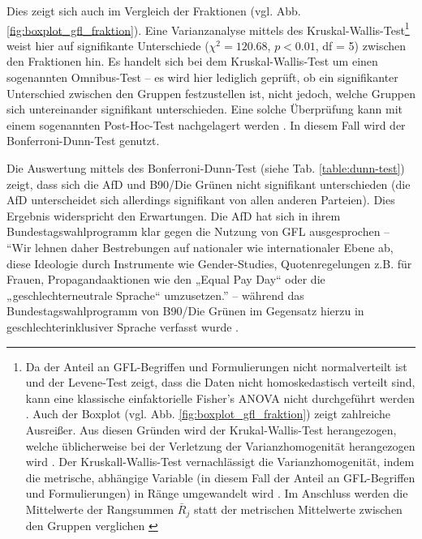 \documentclass[12pt, 
    twoside=false, 
    bibliography=totoc, 
    numbers=endperiod, 
    headings=normal, 
    toc=chapterentrydotfill
    ]{scrbook}
\begin{document}
Dies zeigt sich auch im Vergleich der Fraktionen (vgl. Abb. \ref{fig:boxplot_gfl_fraktion}). Eine Varianzanalyse mittels des Kruskal-Wallis-Test\footnote{Da der Anteil an GFL-Begriffen und Formulierungen nicht normalverteilt ist und der Levene-Test zeigt, dass die Daten nicht homoskedastisch verteilt sind, kann eine klassische einfaktorielle Fisher's ANOVA nicht durchgeführt werden \parencite[64]{huber_2014}. Auch der Boxplot (vgl. Abb. \ref{fig:boxplot_gfl_fraktion}) zeigt zahlreiche Ausreißer. Aus diesen Gründen wird der Krukal-Wallis-Test herangezogen, welche üblicherweise bei der Verletzung der Varianzhomogenität herangezogen wird \parencite[339]{kuhlenkasper_2017}. Der Kruskall-Wallis-Test vernachlässigt die Varianzhomogenität, indem die metrische, abhängige Variable (in diesem Fall der Anteil an GFL-Begriffen und Formulierungen) in Ränge umgewandelt wird \parencite[339f]{kuhlenkasper_2017}. Im Anschluss werden die Mittelwerte der Rangsummen $\bar{R}_j$ statt der metrischen Mittelwerte zwischen den Gruppen verglichen \parencite[340ff.]{kuhlenkasper_2017}} weist hier auf signifikante Unterschiede (${\chi}^2 = 120.68$, $p < 0.01$, df = 5) zwischen den Fraktionen hin.
Es handelt sich bei dem Kruskal-Wallis-Test um einen sogenannten Omnibus-Test \parencite[184]{backhaus_2016} -- es wird hier lediglich geprüft, ob ein signifikanter Unterschied zwischen den Gruppen festzustellen ist, nicht jedoch, welche Gruppen sich untereinander signifikant unterschieden. Eine solche Überprüfung kann mit einem sogenannten Post-Hoc-Test nachgelagert werden \parencite[196]{backhaus_2016}. In diesem Fall wird der Bonferroni-Dunn-Test genutzt. 



Die Auswertung mittels des Bonferroni-Dunn-Test (siehe Tab. \ref{table:dunn-test}) zeigt, dass sich die AfD und B90/Die Grünen nicht signifikant unterschieden (die AfD unterscheidet sich allerdings signifikant von allen anderen Parteien). Dies Ergebnis widerspricht den Erwartungen. Die AfD hat sich in ihrem Bundestagswahlprogramm klar gegen die Nutzung von GFL ausgesprochen -- \enquote{Wir lehnen daher Bestrebungen auf nationaler wie internationaler Ebene ab, diese Ideologie durch Instrumente wie
Gender-Studies, Quotenregelungen z.B. für Frauen, Propagandaaktionen wie den „Equal Pay Day“ oder die „geschlechterneutrale Sprache“ umzusetzen.} \parencite[40]{afd_2017} -- während das Bundestagswahlprogramm von B90/Die Grünen im Gegensatz hierzu in geschlechterinklusiver Sprache verfasst wurde \parencite{b90/diegrunen_2017}.
\end{document}
